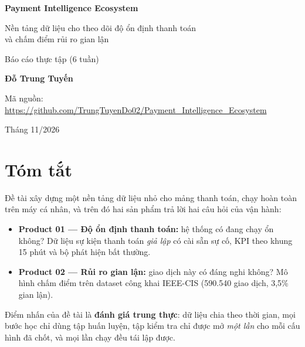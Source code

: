 \documentclass[11pt,a4paper]{article}
\begin{document}
\begin{titlepage}
\centering
\vspace*{3cm}
{\color{navy}\Huge\bfseries Payment Intelligence Ecosystem\par}
\vspace{0.6cm}
{\Large Nền tảng dữ liệu cho theo dõi độ ổn định thanh toán\\ và chấm điểm rủi ro gian lận\par}
\vspace{1.5cm}
{\large Báo cáo thực tập (6 tuần)\par}
\vspace{2.5cm}
{\large\bfseries Đỗ Trung Tuyến\par}
\vspace{0.3cm}
{\normalsize Mã nguồn: \url{https://github.com/TrungTuyenDo02/Payment_Intelligence_Ecosystem}\par}
\vfill
{\normalsize Tháng 11/2026\par}
\end{titlepage}

\section*{Tóm tắt}
Đề tài xây dựng một nền tảng dữ liệu nhỏ cho mảng thanh toán, chạy hoàn toàn trên máy cá nhân, và trên đó hai sản phẩm trả lời hai câu hỏi của vận hành:
\begin{itemize}
  \item \textbf{Product 01 — Độ ổn định thanh toán:} hệ thống có đang chạy ổn không? Dữ liệu sự kiện thanh toán \emph{giả lập} có cài sẵn sự cố, KPI theo khung 15 phút và bộ phát hiện bất thường.
  \item \textbf{Product 02 — Rủi ro gian lận:} giao dịch này có đáng nghi không? Mô hình chấm điểm trên dataset công khai IEEE-CIS (590.540 giao dịch, 3,5\% gian lận).
\end{itemize}
Điểm nhấn của đề tài là \textbf{đánh giá trung thực}: dữ liệu chia theo thời gian, mọi bước học chỉ dùng tập huấn luyện, tập kiểm tra chỉ được mở \emph{một lần} cho mỗi cấu hình đã chốt, và mọi lần chạy đều tái lập được.
\end{document}
